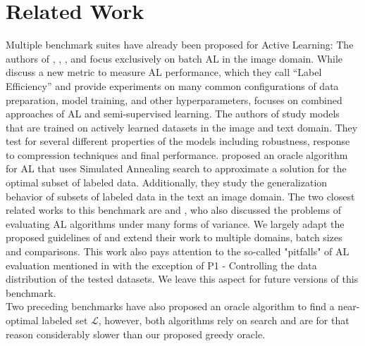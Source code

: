 \documentclass[]{article}
\newcommand{\LL}{\mathcal{L}}
\begin{document}
\section{Related Work}
Multiple benchmark suites have already been proposed for Active Learning:
The authors of \cite{beck2021effective}, \cite{munjal2022towards}, \cite{li2022empirical}, \cite{ji2023randomness} and \cite{luth2024navigating} focus exclusively on batch AL in the image domain.
While \cite{beck2021effective} discuss a new metric to measure AL performance, which they call ``Label Efficiency'' and provide experiments on many common configurations of data preparation, model training, and other hyperparameters, \cite{li2022empirical} focuses on combined approaches of AL and semi-supervised learning.
The authors of \cite{hu2021towards} study models that are trained on actively learned datasets in the image and text domain.
They test for several different properties of the models including robustness, response to compression techniques and final performance.
\cite{zhou2021towards} proposed an oracle algorithm for AL that uses Simulated Annealing search to approximate a solution for the optimal subset of labeled data.
Additionally, they study the generalization behavior of subsets of labeled data in the text an image domain.
The two closest related works to this benchmark are \cite{ji2023randomness} and \cite{luth2024navigating}, who also discussed the problems of evaluating AL algorithms under many forms of variance.
We largely adapt the proposed guidelines of \cite{ji2023randomness} and extend their work to multiple domains, batch sizes and comparisons. 
This work also pays attention to the so-called "pitfalls" of AL evaluation mentioned in \cite{luth2024navigating} with the exception of P1 - Controlling the data distribution of the tested datasets.
We leave this aspect for future versions of this benchmark. \\
Two preceding benchmarks have also proposed an oracle algorithm to find a near-optimal labeled set $\LL$, however, both algorithms rely on search and are for that reason considerably slower than our proposed greedy oracle.

\end{document}
